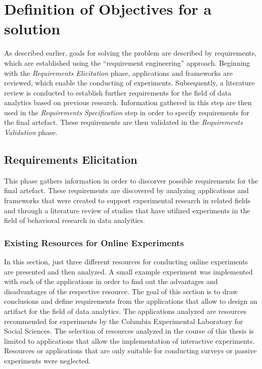 \newpage\section{Definition of Objectives for a solution}\label{sec:objectForSolution}

As described earlier, goals for solving the problem are described by requirements, which are established using the \enquote{requirement engineering} approach. Beginning with the \textit{Requirements Elicitation} phase, applications and frameworks are reviewed, which enable the conducting of experiments. Subsequently, a literature review is conducted to establish further requirements for the field of data analytics based on previous research. Information gathered in this step are then used in the \textit{Requirements Specification} step in order to specify requirements for the final artefact. These requirements are then validated in the \textit{Requirements Validation} phase.

\subsection{Requirements Elicitation}

This phase gathers information in order to discorver possible requirements for the final artefact. These requirements are discovered by analyzing applications and frameworks that were created to support experimental research in related fields and through a literature review of studies that have utilized experiments in the field of behavioral research in data analyitics.

\subsubsection{Existing Resources for Online Experiments}

In this section, just three different resources for conducting online experiments are presented and then analyzed. A small example experiment was implemented with each of the applications in order to find out the advantages and disadvantages of the respective resource. The goal of this section is to draw conclusions and define requirements from the applications that allow to design an artifact for the field of data analytics. The applications analyzed are resources recommended for experiments by the Columbia Experimental Laboratory for Social Sciences. The selection of resources analyzed in the course of this thesis is limited to applications that allow the implementation of interactive experiments. Resources or applications that are only suitable for conducting surveys or passive experiments were neglected.

